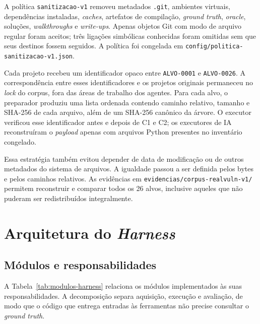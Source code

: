 A política \texttt{sanitizacao-v1} removeu metadados \texttt{.git}, ambientes virtuais, dependências instaladas, \textit{caches}, artefatos de compilação, \textit{ground truth}, \textit{oracle}, soluções, \textit{walkthroughs} e \textit{write-ups}. Apenas objetos Git com modo de arquivo regular foram aceitos; três ligações simbólicas conhecidas foram omitidas sem que seus destinos fossem seguidos. A política foi congelada em \texttt{config/politica-sanitizacao-v1.json}.

Cada projeto recebeu um identificador opaco entre \texttt{ALVO-0001} e \texttt{ALVO-0026}. A correspondência entre esses identificadores e os projetos originais permaneceu no \textit{lock} do corpus, fora das áreas de trabalho dos agentes. Para cada alvo, o preparador produziu uma lista ordenada contendo caminho relativo, tamanho e SHA-256 de cada arquivo, além de um SHA-256 canônico da árvore. O executor verificou esse identificador antes e depois de C1 e C2; os executores de IA reconstruíram o \textit{payload} apenas com arquivos Python presentes no inventário congelado.

Essa estratégia também evitou depender de data de modificação ou de outros metadados do sistema de arquivos. A igualdade passou a ser definida pelos bytes e pelos caminhos relativos. As evidências em \texttt{evidencias/corpus-realvuln-v1/} permitem reconstruir e comparar todos os 26 alvos, inclusive aqueles que não puderam ser redistribuídos integralmente.

\section{Arquitetura do \textit{Harness}}\label{sec:arquitetura-harness}

\subsection{Módulos e responsabilidades}\label{subsec:modulos-harness}

A Tabela~\ref{tab:modulos-harness} relaciona os módulos implementados às suas responsabilidades. A decomposição separa aquisição, execução e avaliação, de modo que o código que entrega entradas às ferramentas não precise consultar o \textit{ground truth}.

